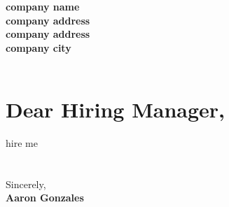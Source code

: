 \documentclass[12pt]{friggeri-cv-coverletter} %
\begin{document}

\textbf{company name} \\
\textbf{company address} \\
\textbf{company address} \\
\textbf{company city}
\\
\\

\section{Dear Hiring Manager,}

hire me \\

\\
\\
Sincerely, \\
\textbf{Aaron Gonzales}

\end{document}
